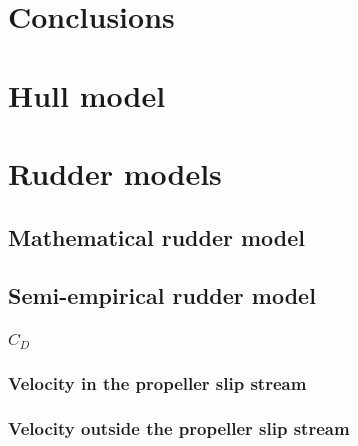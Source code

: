 \documentclass[preprint,12pt,authoryear]{elsarticle}
\begin{document}
%
\section{Conclusions}
\label{sec:conclusions}

\FloatBarrier

\appendix
\section{Hull model}
\label{sec:hull}

%
\section{Rudder models}
\label{sec:rudder_models}
\subsection{Mathematical rudder model}
\label{sec:mathematical_rudder_model}

\subsection{Semi-empirical rudder model}
\label{sec:semi-empirical_rudder_model}
%
\subsubsection{$C_D$}
\label{sec:CD}

\subsubsection{Velocity in the propeller slip stream}
\label{sec:velocity_in_the_propeller_slip_stream}

\subsubsection{Velocity outside the propeller slip stream}
\label{sec:velocity_outside_the_propeller_slip_stream}


\FloatBarrier
\pagebreak


\end{document}
